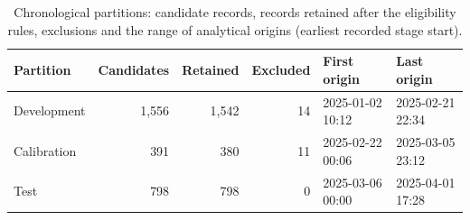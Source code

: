 \begin{table}[!htbp]\centering\small
\caption{Chronological partitions: candidate records, records retained after the eligibility rules, exclusions and the range of analytical origins (earliest recorded stage start).}\label{tab:s_flow}
\begin{tabular}{@{}lrrrll@{}}\toprule
Partition & Candidates & Retained & Excluded & First origin & Last origin \\\midrule
Development & 1,556 & 1,542 & 14 & 2025-01-02 10:12 & 2025-02-21 22:34 \\
Calibration & 391 & 380 & 11 & 2025-02-22 00:06 & 2025-03-05 23:12 \\
Test & 798 & 798 & 0 & 2025-03-06 00:00 & 2025-04-01 17:28 \\
\bottomrule
\end{tabular}
\end{table}
